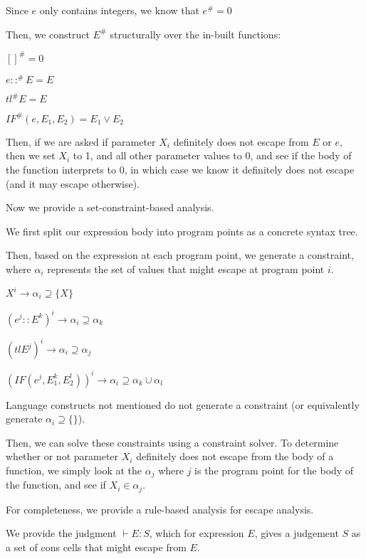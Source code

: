 \begin{enumerate}[label=(\alph*)]
  Since $e$ only contains integers, we know that $e^{\#} = 0$

  Then, we construct $E^{\#}$ structurally over the in-built functions:

  $[]^{\#} = 0$

  $e::^{\#}E = E$

  $tl^{\#} E = E$

  $IF^{\#}(e, E_1, E_2) = E_1 \vee E_2$

  Then, if we are asked if parameter $X_i$ definitely does not escape from $E$ or $e$, then we set $X_i$ to 1, and all other parameter values to 0, and see if the body of the function interprets to $0$, in which case we know it definitely does not escape (and it may escape otherwise).

  \vspace{20pt}

  Now we provide a set-constraint-based analysis.

  We first split our expression body into program points as a concrete syntax tree.

  Then, based on the expression at each program point, we generate a constraint, where $\alpha_i$ represents the set of values that might escape at program point $i$.

  $X^i \rightarrow \alpha_i \supseteq \{X\}$

  $(e^j::E^k)^i \rightarrow \alpha_i \supseteq \alpha_k$

  $(tl E^j)^i \rightarrow \alpha_i \supseteq \alpha_j$

  $(IF(e^j, E_1^k, E_2^l))^i \rightarrow \alpha_i \supseteq \alpha_k \cup \alpha_l$

  Language constructs not mentioned do not generate a constraint (or equivalently generate $\alpha_i \supseteq \{\}$).

  Then, we can solve these constraints using a constraint solver. To determine whether or not parameter $X_i$ definitely does not escape from the body of a function, we simply look at the $\alpha_j$ where $j$ is the program point for the body of the function, and see if $X_i \in \alpha_j$.

  \vspace{20pt}

  For completeness, we provide a rule-based analysis for escape analysis.

  We provide the judgment $\vdash E : S$, which for expression $E$, gives a judgement $S$ as a set of cons cells that might escape from $E$.


\end{enumerate}

